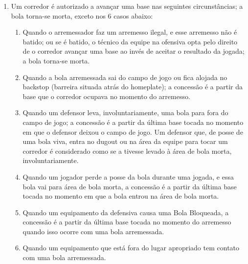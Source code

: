 \begin{multicols}{2}
\begin{enumerate}[label=\alph*)]
\begin{enumerate}[label=\roman*.]
		\item Um corredor \'e autorizado a avan\c{c}ar uma base nas seguintes circunst\^ancias; a bola torna-se morta, exceto nos 6 casos abaixo: 
		\begin{enumerate}[label=\arabic*)]
			\item  Quando o arremessador faz um arremesso ilegal, e esse arremesso n\~ao \'e batido; ou se \'e batido, o t\'ecnico da equipe na ofensiva opta pelo direito de o corredor avan\c{c}ar uma base ao inv\'es de aceitar o resultado da jogada; a bola torna-se morta. 
			\item   Quando a bola arremessada sai do campo de jogo ou fica alojada no \gls{backstop} (barreira situada atr\'as do \gls{homeplate}); a concess\~ao \'e a partir da base que o corredor ocupava no momento do arremesso. 
			\item   Quando um defensor leva, involuntariamente, uma bola para fora do campo de jogo; a concess\~ao \'e a partir da \'ultima base tocada no momento em que o defensor deixou o campo de jogo. Um defensor que, de posse de uma bola viva, entra no \Gls{dugout} ou na \'area da equipe para tocar um corredor \'e considerado como se a tivesse levado \`a \'area de bola morta, involuntariamente. 
			\item   Quando um jogador perde a posse da bola durante uma jogada, e essa bola vai para \'area de bola morta, a concess\~ao \'e a partir da \'ultima base tocada no momento em que a bola entrou na \'area de bola morta. 
			\item   Quando um equipamento da defensiva causa uma Bola Bloqueada, a concess\~ao \'e a partir da \'ultima base tocada no momento do arremesso quando isso ocorre com uma bola arremessada. 
			\item   Quando um equipamento que est\'a fora do lugar apropriado tem contato com uma bola arremessada. 
			

\end{enumerate}
\end{enumerate}
\end{enumerate}
\end{multicols}
